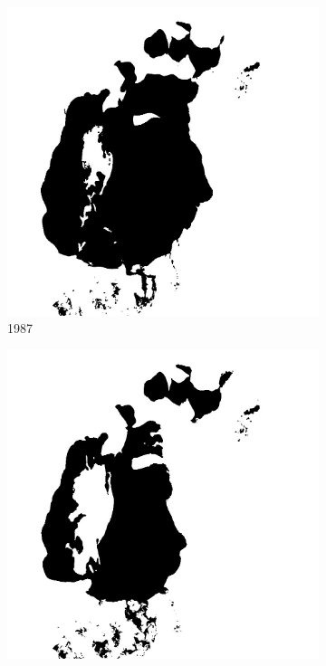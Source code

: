 \documentclass[12pt,a4paper]{article}
\begin{document}
\begin{figure}[H]
\begin{subfigure}[b]{0.19\textwidth}
        \includegraphics[width=\textwidth]{../img/1987w.jpg}
        \caption{1987}
    \end{subfigure}
    \begin{subfigure}[b]{0.19\textwidth}
        \centering
        \includegraphics[width=\textwidth]{../img/1998w.jpg}

\end{subfigure}
\end{figure}
\end{document}
